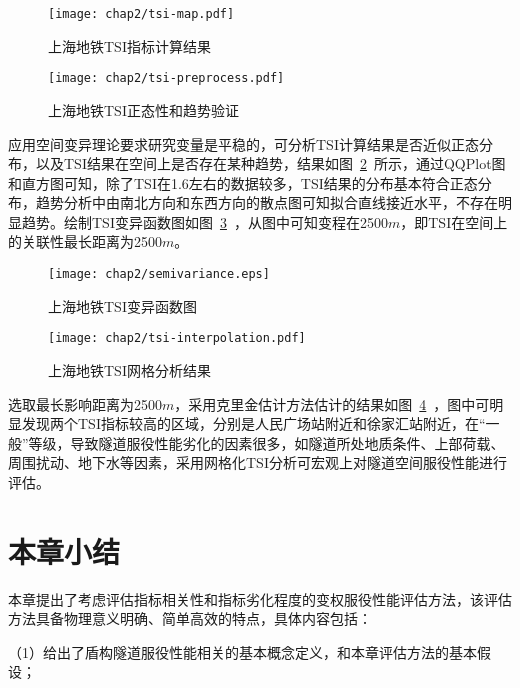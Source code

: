 \begin{figure}[htb!]
    \centering
    \texttt{[image: chap2/tsi-map.pdf]}
    \caption{上海地铁TSI指标计算结果}
    \label{fig:上海地铁TSI指标计算结果}
\end{figure}

\begin{figure}[htb!]
    \centering
    \texttt{[image: chap2/tsi-preprocess.pdf]}
    \caption{上海地铁TSI正态性和趋势验证}
    \label{fig:上海地铁TSI正态性和趋势验证}
\end{figure}

应用空间变异理论要求研究变量是平稳的，可分析TSI计算结果是否近似正态分布，以及TSI结果在空间上是否存在某种趋势，结果如图~\ref{fig:上海地铁TSI正态性和趋势验证}~所示，通过QQPlot图和直方图可知，除了TSI在1.6左右的数据较多，TSI结果的分布基本符合正态分布，趋势分析中由南北方向和东西方向的散点图可知拟合直线接近水平，不存在明显趋势。绘制TSI变异函数图如图~\ref{fig:上海地铁TSI变异函数图}~，从图中可知变程在2500$m$，即TSI在空间上的关联性最长距离为2500$m$。

\begin{figure}[htb!]
    \centering
    \texttt{[image: chap2/semivariance.eps]}
    \caption{上海地铁TSI变异函数图}
    \label{fig:上海地铁TSI变异函数图}
\end{figure}

\begin{figure}[htb!]
    \centering
    \texttt{[image: chap2/tsi-interpolation.pdf]}
    \caption{上海地铁TSI网格分析结果}
    \label{fig:上海地铁TSI网格分析结果}
\end{figure}

选取最长影响距离为2500$m$，采用克里金估计方法估计的结果如图~\ref{fig:上海地铁TSI网格分析结果}~，图中可明显发现两个TSI指标较高的区域，分别是人民广场站附近和徐家汇站附近，在“一般”等级，导致隧道服役性能劣化的因素很多，如隧道所处地质条件、上部荷载、周围扰动、地下水等因素，采用网格化TSI分析可宏观上对隧道空间服役性能进行评估。

\section{本章小结}

本章提出了考虑评估指标相关性和指标劣化程度的变权服役性能评估方法，该评估方法具备物理意义明确、简单高效的特点，具体内容包括：

（1）给出了盾构隧道服役性能相关的基本概念定义，和本章评估方法的基本假设；

